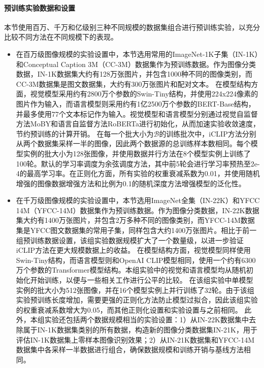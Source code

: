 \paragraph{预训练实验数据和设置} 本节使用百万、千万和亿级别三种不同规模的数据集组合进行预训练实验，以充分比较不同方法在不同规模下的表现。
\begin{itemize}
    \item 在百万级图像规模的实验设置中，本节选用常用的ImageNet-1K子集\cite{deng2009imagenet}（IN-1K）和Conceptual Caption 3M\cite{sharma-etal-2018-conceptual}（CC-3M）数据集作为预训练数据。作为图像分类数据，IN-1K数据集大约有128万张图片，并包含1000种不同的图像类别，而CC-3M数据集是图文数据集，大约有300万张图片和配对文本。
    在模型结构方面，视觉模型采用约有2800万个参数的Swin-Tiny\cite{Swin}结构，并使用224x224像素的图片作为输入，而语言模型则采用约有1亿2500万个参数的BERT-Base\cite{BERT}结构，并最多使用77个文本标记作为输入。视觉模型和语言模型分别通过视觉自监督方法MoBY\cite{MoBY}和语言自监督方法RoBERTa\cite{liu2019roberta}进行初始化，从而加速实验收敛速度，节约预训练的计算开销。
    在每一个批大小为$\mathcal{B}$的训练批次中，iCLIP方法分别从两个数据集采样一半的图像，因此两个数据源的总训练样本数相同。每个模型实例的批大小为128张图像，并使用数据并行方法在8个模型实例上训练了100轮。默认的学习率调度为余弦调度方法，其中前5轮会进行学习率预热至2e-4的最高学习率。在正则化方面，所有实验的权重衰减系数为0.01，并使用随机增强\cite{cubuk2020randaugment}的图像数据增强方法和比例为0.1的随机深度\cite{huang2016deep}方法增强模型的泛化性。
    \item 在千万级图像规模的实验设置中，本节选用ImageNet全集（IN-22K）和YFCC 14M\cite{YFCC100M}（YFCC-14M）数据集作为预训练数据。作为图像分类数据，IN-22K数据集大约有1400万张图片，并包含2万多种不同的图像类别，而YFCC-14M数据集是YFCC图文数据集\cite{YFCC100M}的常用子集，同样包含大约1400万张图片。相比于前一组预训练数据设置，该组实验数据规模扩大了一个数量级，以进一步验证iCLIP方法在更大规模数据上的收益。
    在模型结构方面，视觉模型同样使用Swin-Tiny结构，而语言模型则和OpenAI CLIP模型\cite{radford2021learning}相同，使用一个约有6300万个参数的Transformer\cite{Transformer}模型结构。本组实验中的视觉和语言模型均从随机初始化开始训练，以便与一些相关工作进行公平的比较。
    在该组实验中单模型实例的批大小为512张图像，并在16个模型实例上并行训练了32轮。由于该组实验预训练长度增加，需要更强的正则化方法防止模型过拟合，因此该组实验的权重衰减系数增大为0.05，而其他正则化设置和实验设置与之前相同。%
    此外，本组实验还包括两个数据规模相当的实验设置：1）从IN-22K数据集中去除属于IN-1K数据集类别的所有数据，构造新的图像分类数据集IN-21K，用于评估IN-1K数据集上零样本图像识别效果；2）从IN-21K数据集和YFCC-14M数据集中各采样一半数据进行组合，确保数据规模和训练开销与基线方法相同。

\end{itemize}
